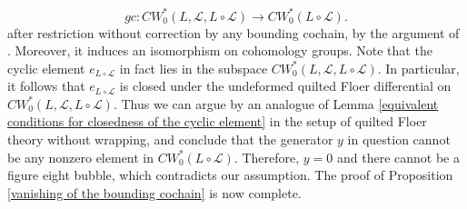 \documentclass{amsart}
\numberwithin{equation}{section}
\numberwithin{figure}{section}
\begin{document}
\begin{equation}\label{geometric composition map on low action part of Floer complexes}
gc: CW^{*}_{0}(L, \mathcal{L}, L \circ \mathcal{L}) \to CW^{*}_{0}(L \circ \mathcal{L}).
\end{equation}
after restriction without correction by any bounding cochain, by the argument of \cite{Lekili-Lipyanskiy}. Moreover, it induces an isomorphism on cohomology groups.
Note that the cyclic element $e_{L \circ \mathcal{L}}$ in fact lies in the subspace $CW^{*}_{0}(L, \mathcal{L}, L \circ \mathcal{L})$. In particular, it follows that $e_{L \circ \mathcal{L}}$ is closed under the undeformed quilted Floer differential on $CW^{*}_{0}(L, \mathcal{L}, L \circ \mathcal{L})$.
Thus we can argue by an analogue of Lemma \eqref{equivalent conditions for closedness of the cyclic element} in the setup of quilted Floer theory without wrapping, and conclude that the generator $y$ in question cannot be any nonzero element in $CW^{*}_{0}(L \circ \mathcal{L})$. 
Therefore, $y = 0$ and there cannot be a figure eight bubble, which contradicts our assumption.
The proof of Proposition \ref{vanishing of the bounding cochain} is now complete. \par
\end{document}
